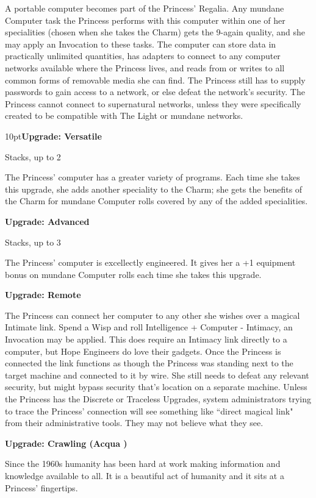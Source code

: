 A portable computer becomes part of the Princess’ Regalia. Any mundane Computer task the Princess performs with this computer within one of her specialities (chosen when she takes the Charm) gets the 9-again quality, and she may apply an Invocation to these tasks. The computer can store data in practically unlimited quantities, has adapters to connect to any computer networks available where the Princess lives, and reads from or writes to all common forms of removable media she can find. The Princess still has to supply passwords to gain access to a network, or else defeat the network’s security. The Princess cannot connect to supernatural networks, unless they were specifically created to be compatible with The Light or mundane networks. 

\begin{myindentpar}{10pt}\textbf{Upgrade: Versatile}

Stacks, up to 2 

The Princess' computer has a greater variety of programs. Each time she takes this upgrade, she adds another speciality to the Charm; she gets the benefits of the Charm for mundane Computer rolls covered by any of the added specialities. 

\textbf{Upgrade: Advanced}

Stacks, up to 3

The Princess' computer is excellectly engineered. It gives her a +1 equipment bonus on mundane Computer rolls each time she takes this upgrade.

\textbf{Upgrade: Remote}

The Princess can connect her computer to any other she wishes over a magical Intimate link. Spend a Wisp and roll Intelligence + Computer - Intimacy, an Invocation may be applied. This does require an Intimacy link directly to a computer, but Hope Engineers do love their gadgets. Once the Princess is connected the link functions as though the Princess was standing next to the target machine and connected to it by wire. She still needs to defeat any relevant security, but might bypass security that's location on a separate machine. Unless the Princess has the Discrete or Traceless Upgrades, system administrators trying to trace the Princess' connection will see something like \textquotedblleft direct magical link" from their administrative tools. They may not believe what they see. 

\textbf{Upgrade: Crawling (Acqua \textbullet\textbullet)}

Since the 1960s humanity has been hard at work making information and knowledge available to all. It is a beautiful act of humanity and it sits at a Princess' fingertips. 


\end{myindentpar}
